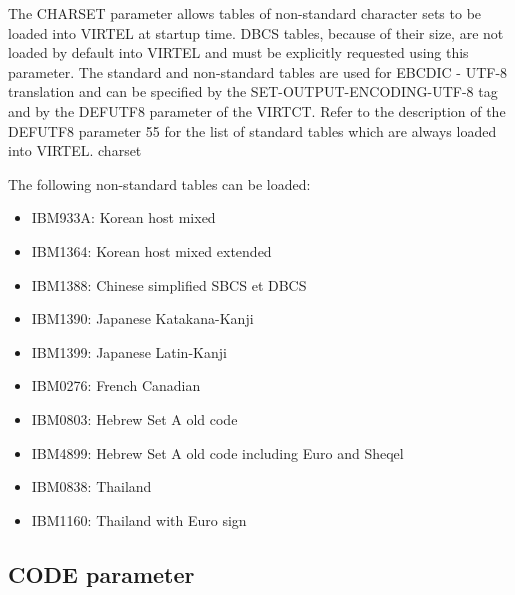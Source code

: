 \documentclass[letterpaper,10pt,english]{sphinxmanual}
\begin{document}
The CHARSET parameter allows tables of non-standard character sets to be loaded into VIRTEL at startup time. DBCS tables, because of their size, are not loaded by default into VIRTEL and must be explicitly requested using this parameter. The standard and non-standard tables are used for EBCDIC - UTF-8 translation and can be specified by the SET-OUTPUT-ENCODING-UTF-8 tag and by the DEFUTF8 parameter of the VIRTCT. Refer to the description of the DEFUTF8 parameter 55 for the list of standard tables which are always loaded into VIRTEL.
charset

The following non-standard tables can be loaded:
\begin{itemize}
\item {} 
IBM933A: Korean host mixed

\item {} 
IBM1364: Korean host mixed extended

\item {} 
IBM1388: Chinese simplified SBCS et DBCS

\item {} 
IBM1390: Japanese Katakana-Kanji

\item {} 
IBM1399: Japanese Latin-Kanji

\item {} 
IBM0276: French Canadian

\item {} 
IBM0803: Hebrew Set A old code

\item {} 
IBM4899: Hebrew Set A old code including Euro and Sheqel

\item {} 
IBM0838: Thailand

\item {} 
IBM1160: Thailand with Euro sign

\end{itemize}

\ignorespaces 

\subsection{CODE parameter}
\label{\detokenize{Installation_Guide:code-parameter}}\label{\detokenize{Installation_Guide:index-44}}
\begin{sphinxVerbatim}[commandchars=\\\{\}]
 
\end{sphinxVerbatim}
\end{document}
